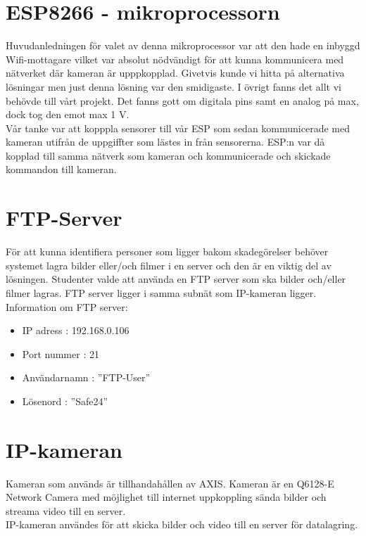 \section{ESP8266 - mikroprocessorn}
Huvudanledningen för valet av denna mikroprocessor var att den hade en inbyggd Wifi-mottagare vilket var absolut nödvändigt för att kunna kommunicera med nätverket där kameran är upppkopplad. Givetvis kunde vi hitta på alternativa lösningar men just denna lösning var den smidigaste. I övrigt fanns det allt vi behövde till vårt projekt. Det fanns gott om digitala pins samt en analog på max, dock tog den emot max 1 V. \\

Vår tanke var att kopppla sensorer till vår ESP som sedan kommunicerade med kameran utifrån de uppgiffter som lästes in från sensorerna. ESP:n var då kopplad till samma nätverk som kameran och kommunicerade och skickade kommandon till kameran.\\
\section{FTP-Server}
För att kunna identifiera personer som ligger bakom skadegörelser behöver systemet lagra bilder eller/och filmer i en server och den är en viktig del av lösningen. Studenter valde att använda en FTP server som ska bilder och/eller filmer lagras.  FTP server ligger i samma subnät som IP-kameran ligger. Information om FTP server:

\begin{itemize}
\item IP adress : 192.168.0.106

\item Port nummer : 21

\item Användarnamn : ”FTP-User”

\item Lösenord : ”Safe24”

\end{itemize}
\section{IP-kameran}
Kameran som används är tillhandahållen av AXIS. Kameran är en Q6128-E Network Camera med möjlighet till internet uppkoppling sända bilder och streama video till en server.\\

IP-kameran användes för att skicka bilder och video till en server för datalagring.\\

